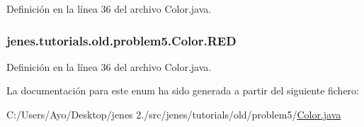 Definición en la línea 36 del archivo Color.\-java.

\hypertarget{enumjenes_1_1tutorials_1_1old_1_1problem5_1_1_color_ad51840590e9a87bd4367c25e5022866b}{
\subsubsection[{R\-E\-D}]{\setlength{\rightskip}{0pt plus 5cm}jenes.\-tutorials.\-old.\-problem5.\-Color.\-R\-E\-D}}\label{enumjenes_1_1tutorials_1_1old_1_1problem5_1_1_color_ad51840590e9a87bd4367c25e5022866b}


Definición en la línea 36 del archivo Color.\-java.



La documentación para este enum ha sido generada a partir del siguiente fichero\-:\begin{DoxyCompactItemize}
\item 
C\-:/\-Users/\-Ayo/\-Desktop/jenes 2./src/jenes/tutorials/old/problem5/\hyperlink{old_2problem5_2_color_8java}{Color.\-java}\end{DoxyCompactItemize}
